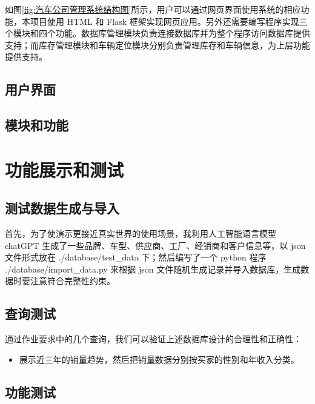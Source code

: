 \documentclass[hyperref,a4paper,UTF8]{ctexart}
\begin{document}
如图\ref{fig:汽车公司管理系统结构图}所示，用户可以通过网页界面使用系统的相应功能，本项目使用 HTML 和 Flask 框架实现网页应用。另外还需要编写程序实现三个模块和四个功能。数据库管理模块负责连接数据库并为整个程序访问数据库提供支持；而库存管理模块和车辆定位模块分别负责管理库存和车辆信息，为上层功能提供支持。

\subsection{用户界面}

\subsection{模块和功能}


\section{功能展示和测试\label{sec:功能展示和测试}}

\subsection{测试数据生成与导入}

首先，为了使演示更接近真实世界的使用场景，我利用人工智能语言模型 chatGPT 生成了一些品牌、车型、供应商、工厂、经销商和客户信息等，以 json 文件形式放在 ./database/test\_data 下；然后编写了一个 python 程序 ./database/import\_data.py 来根据 json 文件随机生成记录并导入数据库，生成数据时要注意符合完整性约束。

\subsection{查询测试}

通过作业要求中的几个查询，我们可以验证上述数据库设计的合理性和正确性：

\begin{itemize}
    \item 展示近三年的销量趋势，然后把销量数据分别按买家的性别和年收入分类。
\end{itemize}



\subsection{功能测试}
\end{document}
